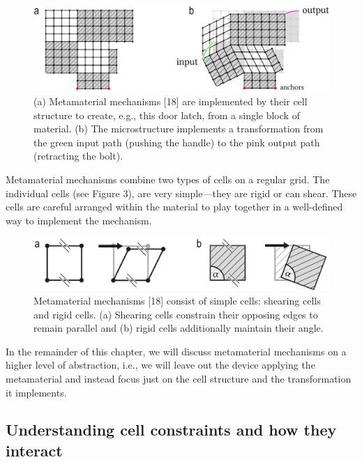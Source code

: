 \begin{figure} [h]
    \includegraphics[width=\textwidth]{chapters/understanding-metamaterial-mechanisms-FIG/2-comparison-doorlatch.png}
    \caption[Short figure name.]{(a) Metamaterial mechanisms [18] are implemented by their cell structure to create, e.g., this door latch, from a single block of material. (b) The microstructure implements a transformation from the green input path (pushing the handle) to the pink output path (retracting the bolt).
    \label{fig:2-compare-doorlatch}}
\end{figure}

Metamaterial mechanisms combine two types of cells on a regular grid. The individual cells (see Figure 3), are very simple---they are rigid or can shear. These cells are careful arranged within the material to play together in a well-defined way to implement the mechanism.

\begin{figure} [h]
    \includegraphics[width=\textwidth]{chapters/understanding-metamaterial-mechanisms-FIG/3-individual-cells.png}
    \caption[Short figure name.]{Metamaterial mechanisms [18] consist of simple cells: shearing cells and rigid cells. (a) Shearing cells constrain their opposing edges to remain parallel and (b) rigid cells additionally maintain their angle.
    \label{fig:3-individual-cells}}
\end{figure}

In the remainder of this chapter, we will discuss metamaterial mechanisms on a higher level of abstraction, i.e., we will leave out the device applying the metamaterial and instead focus just on the cell structure and the transformation it implements.


\subsection{Understanding cell constraints and how they interact}


